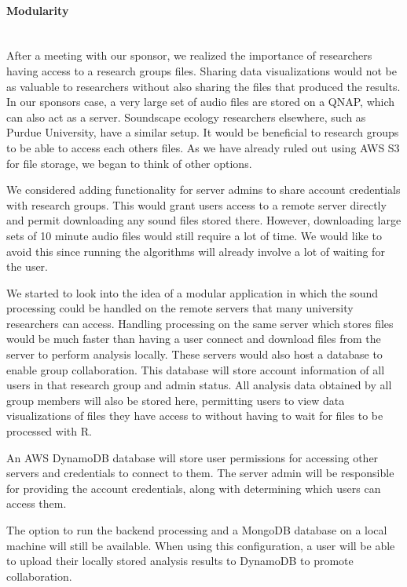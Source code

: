 \paragraph{Modularity} \mbox{}\\[\paragraphheaderspace]
After a meeting with our sponsor, we realized the importance of researchers having access to a research group\textquotesingle s files. Sharing data visualizations would not be as valuable to researchers without also sharing the files that produced the results. In our sponsor\textquotesingle s case, a very large set of audio files are stored on a QNAP, which can also act as a server. Soundscape ecology researchers elsewhere, such as Purdue University, have a similar setup. It would be beneficial to research groups to be able to access each other\textquotesingle s files. As we have already ruled out using AWS S3 for file storage, we began to think of other options.\par
We considered adding functionality for server admins to share account credentials with research groups. This would grant users access to a remote server directly and permit downloading any sound files stored there. However, downloading large sets of 10 minute audio files would still require a lot of time. We would like to avoid this since running the  algorithms will already involve a lot of waiting for the user.\par
We started to look into the idea of a modular application in which the sound processing could be handled on the remote servers that many university researchers can access. Handling processing on the same server which stores files would be much faster than having a user connect and download files from the server to perform analysis locally. These servers would also host a database to enable group collaboration. This database will store account information of all users in that research group and admin status. All analysis data obtained by all group members will also be stored here, permitting users to view data visualizations of files they have access to without having to wait for files to be processed with R.\par
An AWS DynamoDB database will store user permissions for accessing other servers and credentials to connect to them. The server admin will be responsible for providing the account credentials, along with determining which users can access them.\par
The option to run the backend processing and a MongoDB database on a local machine will still be available. When using this configuration, a user will be able to upload their locally stored analysis results to DynamoDB to promote collaboration.\par
